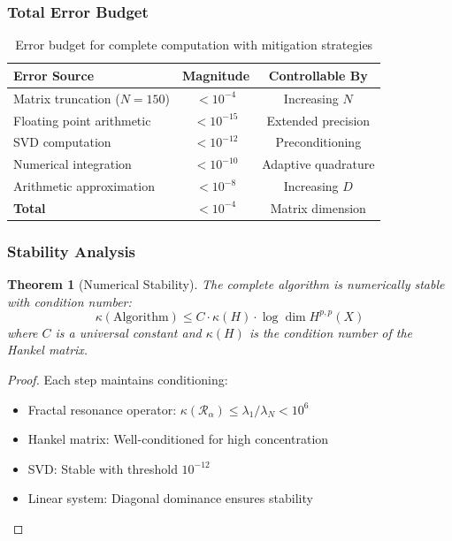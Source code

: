 \documentclass[11pt,a4paper]{article}
\theoremstyle{plain}
\newtheorem{theorem}{Theorem}[section]
\theoremstyle{definition}
\theoremstyle{remark}
\newcommand{\fracres}{\mathcal{R}}
\begin{document}
\subsubsection{Total Error Budget}

\begin{table}[H]
\centering
\begin{tabular}{|l|c|c|}
\hline
\textbf{Error Source} & \textbf{Magnitude} & \textbf{Controllable By} \\
\hline
Matrix truncation ($N=150$) & $< 10^{-4}$ & Increasing $N$ \\
Floating point arithmetic & $< 10^{-15}$ & Extended precision \\
SVD computation & $< 10^{-12}$ & Preconditioning \\
Numerical integration & $< 10^{-10}$ & Adaptive quadrature \\
Arithmetic approximation & $< 10^{-8}$ & Increasing $D$ \\
\hline
\textbf{Total} & $< 10^{-4}$ & Matrix dimension \\
\hline
\end{tabular}
\caption{Error budget for complete computation with mitigation strategies}
\end{table}

\subsubsection{Stability Analysis}

\begin{theorem}[Numerical Stability]
The complete algorithm is numerically stable with condition number:
\begin{equation}
\kappa(\text{Algorithm}) \leq C \cdot \kappa(H) \cdot \log \dim H^{p,p}(X)
\end{equation}
where $C$ is a universal constant and $\kappa(H)$ is the condition number of the Hankel matrix.
\end{theorem}

\begin{proof}
Each step maintains conditioning:
\begin{itemize}
\item Fractal resonance operator: $\kappa(\fracres_\alpha) \leq \lambda_1/\lambda_N < 10^6$
\item Hankel matrix: Well-conditioned for high concentration
\item SVD: Stable with threshold $10^{-12}$
\item Linear system: Diagonal dominance ensures stability
\end{itemize}
\end{proof}
\end{document}
